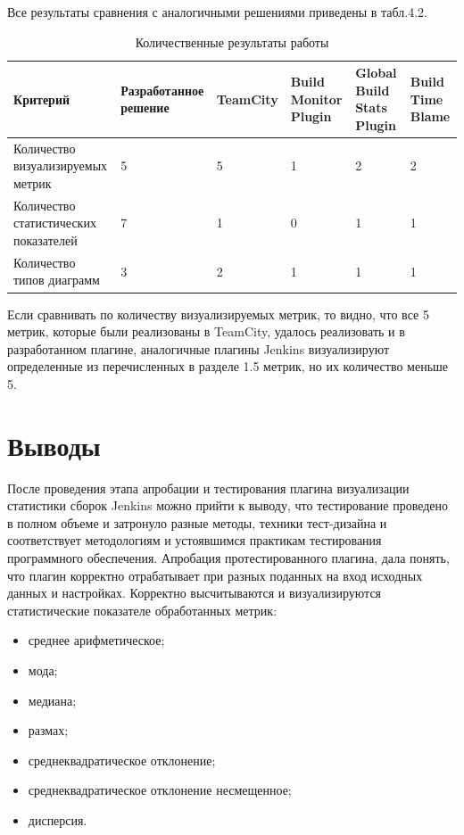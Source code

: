 Все результаты сравнения с аналогичными решениями приведены в табл.4.2.

 \begin{table}
    \centering
    \caption{Количественные результаты работы}
    \begin{tabular}{|p{3cm}|p{3cm}|p{2cm}|p{2cm}|p{2cm}|p{2cm}|}
    \hline
        Критерий & Разработанное решение & TeamCity & Build Monitor Plugin & Global Build Stats Plugin  & Build Time Blame \\ \hline
        Количество визуализируемых метрик & 5 & 5 & 1 & 2 &2 \\ \hline
        Количество статистических показателей & 7 & 1 & 0 & 1 &1\\ \hline
        Количество типов диаграмм & 3 & 2 & 1 & 1 &1\\ \hline


    \end{tabular}
\end{table}

Если сравнивать по количеству визуализируемых метрик, то видно, что все 5 метрик, которые были реализованы в TeamCity, удалось реализовать и в разработанном плагине, аналогичные плагины Jenkins визуализируют определенные из перечисленных в разделе 1.5 метрик, но их количество меньше 5.


 
 
\section{Выводы} \label{ch4:sec3}

После проведения этапа апробации и тестирования плагина визуализации статистики сборок Jenkins можно прийти к выводу, что тестирование проведено в полном объеме и затронуло разные методы, техники тест-дизайна и соответствует методологиям и устоявшимся практикам тестирования программного обеспечения. Апробация протестированного плагина, дала понять, что плагин корректно отрабатывает при разных поданных на вход исходных данных и настройках. Корректно высчитываются и визуализируются статистические показателе обработанных метрик:

\begin{itemize}
	\item среднее арифметическое;
	\item мода;
	\item медиана;
	\item размах;
	\item среднеквадратическое отклонение;
	\item среднеквадратическое отклонение несмещенное;
	\item дисперсия.
\end{itemize}

